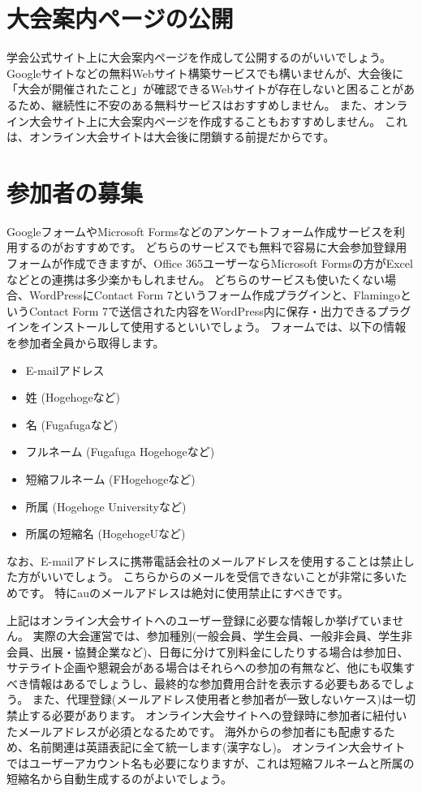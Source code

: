 \documentclass[titlepage,10pt,a4paper,uplatex]{jsbook}
\begin{document}
\section{大会案内ページの公開}

学会公式サイト上に大会案内ページを作成して公開するのがいいでしょう。
Googleサイトなどの無料Webサイト構築サービスでも構いませんが、大会後に「大会が開催されたこと」が確認できるWebサイトが存在しないと困ることがあるため、継続性に不安のある無料サービスはおすすめしません。
また、オンライン大会サイト上に大会案内ページを作成することもおすすめしません。
これは、オンライン大会サイトは大会後に閉鎖する前提だからです。

\section{参加者の募集}

GoogleフォームやMicrosoft Formsなどのアンケートフォーム作成サービスを利用するのがおすすめです。
どちらのサービスでも無料で容易に大会参加登録用フォームが作成できますが、Office 365ユーザーならMicrosoft Formsの方がExcelなどとの連携は多少楽かもしれません。
どちらのサービスも使いたくない場合、WordPressにContact Form 7というフォーム作成プラグインと、FlamingoというContact Form 7で送信された内容をWordPress内に保存・出力できるプラグインをインストールして使用するといいでしょう。
フォームでは、以下の情報を参加者全員から取得します。

\begin{itemize}
\item E-mailアドレス
\item 姓 (Hogehogeなど)
\item 名 (Fugafugaなど)
\item フルネーム (Fugafuga Hogehogeなど)
\item 短縮フルネーム (FHogehogeなど)
\item 所属 (Hogehoge Universityなど)
\item 所属の短縮名 (HogehogeUなど)
\end{itemize}

なお、E-mailアドレスに携帯電話会社のメールアドレスを使用することは禁止した方がいいでしょう。
こちらからのメールを受信できないことが非常に多いためです。
特にauのメールアドレスは絶対に使用禁止にすべきです。

上記はオンライン大会サイトへのユーザー登録に必要な情報しか挙げていません。
実際の大会運営では、参加種別(一般会員、学生会員、一般非会員、学生非会員、出展・協賛企業など)、日毎に分けて別料金にしたりする場合は参加日、サテライト企画や懇親会がある場合はそれらへの参加の有無など、他にも収集すべき情報はあるでしょうし、最終的な参加費用合計を表示する必要もあるでしょう。
また、代理登録(メールアドレス使用者と参加者が一致しないケース)は一切禁止する必要があります。
オンライン大会サイトへの登録時に参加者に紐付いたメールアドレスが必須となるためです。
海外からの参加者にも配慮するため、名前関連は英語表記に全て統一します(漢字なし)。
オンライン大会サイトではユーザーアカウント名も必要になりますが、これは短縮フルネームと所属の短縮名から自動生成するのがよいでしょう。
\end{document}
